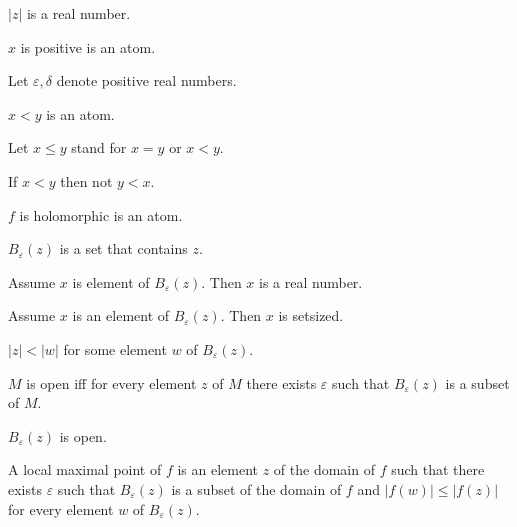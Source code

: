 \documentclass{article}
\newcommand{\Ball}[2]{B_{#1}(#2)}
\begin{document}
\begin{forthel}
    \begin{signature}
      $|z|$ is a real number.
    \end{signature}

    \begin{signature}
      $x$ is positive is an atom.
    \end{signature}

    Let $\varepsilon, \delta$ denote positive real numbers.

    \begin{signature}
      $x < y$ is an atom.
    \end{signature}

    Let $x \leq y$ stand for $x = y$ or $x < y$.

    \begin{axiom}
      If $x < y$ then not $y < x$.
    \end{axiom}

    \begin{signature}
      $f$ is holomorphic is an atom.
    \end{signature}

    \begin{signature}
      $\Ball{\varepsilon}{z}$ is a set that contains $z$.
    \end{signature}

    \begin{axiom}
      Assume $x$ is element of $\Ball{\varepsilon}{z}$. Then $x$ is a real number.
    \end{axiom}

    \begin{lemma}
      Assume $x$ is an element of $\Ball{\varepsilon}{z}$. Then $x$ is setsized.
    \end{lemma}

    \begin{axiom}
      $|z| < |w|$ for some element $w$ of $\Ball{\varepsilon}{z}$.
    \end{axiom}

    \begin{definition}
      $M$ is open iff for every element $z$ of $M$ there exists $\varepsilon$ such that
        $\Ball{\varepsilon}{z}$ is a subset of $M$.
    \end{definition}

    \begin{axiom}
      $\Ball{\varepsilon}{z}$ is open.
    \end{axiom}

    \begin{definition}
      A local maximal point of $f$ is an element $z$ of the domain of $f$ such that there exists $\varepsilon$ such that $\Ball{\varepsilon}{z}$ is a subset of the domain of $f$ and $|f(w)| \leq |f(z)|$ for every element $w$ of $\Ball{\varepsilon}{z}$.
    \end{definition}


\end{forthel}
\end{document}
